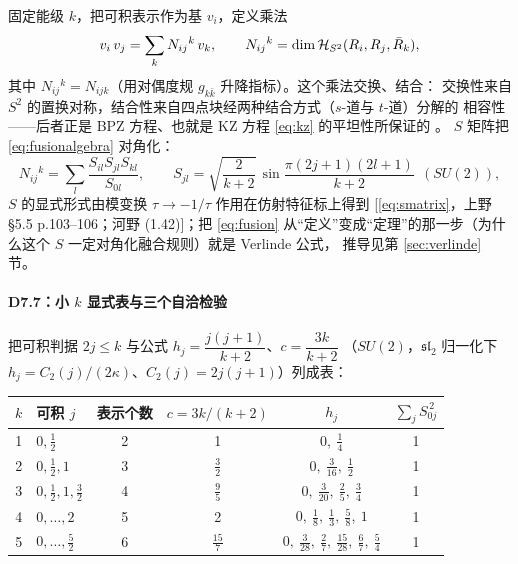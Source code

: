 固定能级 $k$，把可积表示作为基 $v_i$，定义乘法
\begin{equation}
v_i\,v_j=\sum_k N_{ij}{}^k\,v_k ,
\qquad N_{ij}{}^k=\dim\mathcal{H}_{S^2}(R_i,R_j,\bar R_k),
\label{eq:fusionalgebra}
\end{equation}
其中 $N_{ij}{}^k=N_{ijk}$（用对偶度规 $g_{k\bar k}$ 升降指标）。这个乘法交换、结合：
交换性来自 $S^2$ 的置换对称，结合性来自四点块经两种结合方式（$s$-道与 $t$-道）分解的
相容性——后者正是 BPZ 方程、也就是 KZ 方程 \eqref{eq:kz} 的平坦性所保证的 \ours。
$S$ 矩阵把 \eqref{eq:fusionalgebra} 对角化：
\begin{equation}
N_{ij}{}^k=\sum_l\frac{S_{il}S_{jl}S_{kl}}{S_{0l}},
\qquad
S_{jl}=\sqrt{\frac{2}{k+2}}\,\sin\frac{\pi(2j+1)(2l+1)}{k+2}
\ \ (SU(2)),
\label{eq:fusion}
\end{equation}
$S$ 的显式形式由模变换 $\tau\to-1/\tau$ 作用在仿射特征标上得到
[\eqref{eq:smatrix}，上野 \S5.5 p.103--106；河野 (1.42)]；把 \eqref{eq:fusion}
从“定义”变成“定理”的那一步（为什么这个 $S$ 一定对角化融合规则）就是 Verlinde 公式，
推导见第 \ref{sec:verlinde} 节。

\paragraph{D7.7：小 $k$ 显式表与三个自洽检验}

把可积判据 $2j\le k$ 与公式 $h_j=\dfrac{j(j+1)}{k+2}$、$c=\dfrac{3k}{k+2}$
（$SU(2)$，$\mathfrak{sl}_2$ 归一化下 $h_j=C_2(j)/(2\kappa)$、$C_2(j)=2j(j+1)$）列成表：

\begin{center}
\small
\begin{tabular}{@{}clcccc@{}}
\toprule
$k$ & 可积 $j$ & 表示个数 & $c=3k/(k+2)$ & $h_j$ & $\sum_jS_{0j}^{\,2}$ \\
\midrule
1 & $0,\frac12$ & 2 & 1 & $0,\ \frac14$ & 1 \\
2 & $0,\frac12,1$ & 3 & $\frac32$ & $0,\ \frac{3}{16},\ \frac12$ & 1 \\
3 & $0,\frac12,1,\frac32$ & 4 & $\frac95$ & $0,\ \frac{3}{20},\ \frac25,\ \frac34$ & 1 \\
4 & $0,\dots,2$ & 5 & 2 & $0,\ \frac18,\ \frac13,\ \frac58,\ 1$ & 1 \\
5 & $0,\dots,\frac52$ & 6 & $\frac{15}{7}$ & $0,\ \frac{3}{28},\ \frac27,\ \frac{15}{28},\ \frac67,\ \frac54$ & 1 \\
\bottomrule
\end{tabular}
\end{center}

